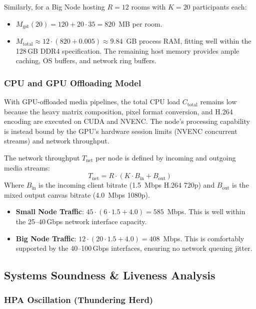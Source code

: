 \documentclass{article}
\begin{document}
Similarly, for a Big Node hosting $R = 12$ rooms with $K = 20$ participants each:
\begin{itemize}
    \item $M_{\text{gst}}(20) = 120 + 20 \cdot 35 = 820$~MB per room.
    \item $M_{\text{total}} \approx 12 \cdot (820 + 0.005) \approx 9.84$~GB process RAM,
          fitting well within the 128\,GB DDR4 specification. The remaining host memory
          provides ample caching, OS buffers, and network ring buffers.
\end{itemize}

\subsubsection{CPU and GPU Offloading Model}

With GPU-offloaded media pipelines, the total CPU load $C_{\text{total}}$ remains low because
the heavy matrix composition, pixel format conversion, and H.264 encoding are executed on CUDA
and NVENC. The node's processing capability is instead bound by the GPU's hardware session
limits (NVENC concurrent streams) and network throughput.

The network throughput $T_{\text{net}}$ per node is defined by incoming and outgoing media streams:
\begin{equation}
T_{\text{net}} = R \cdot \left( K \cdot B_{\text{in}} + B_{\text{out}} \right)
\end{equation}
Where $B_{\text{in}}$ is the incoming client bitrate (1.5~Mbps H.264 720p) and $B_{\text{out}}$
is the mixed output canvas bitrate (4.0~Mbps 1080p).
\begin{itemize}
    \item \textbf{Small Node Traffic}: $45 \cdot (6 \cdot 1.5 + 4.0) = 585$~Mbps.
          This is well within the 25--40\,Gbps network interface capacity.
    \item \textbf{Big Node Traffic}: $12 \cdot (20 \cdot 1.5 + 4.0) = 408$~Mbps.
          This is comfortably supported by the 40--100\,Gbps interfaces, ensuring no network queuing jitter.
\end{itemize}

\newpage
\subsection{Systems Soundness \& Liveness Analysis}

\subsubsection*{HPA Oscillation (Thundering Herd)}
\end{document}
